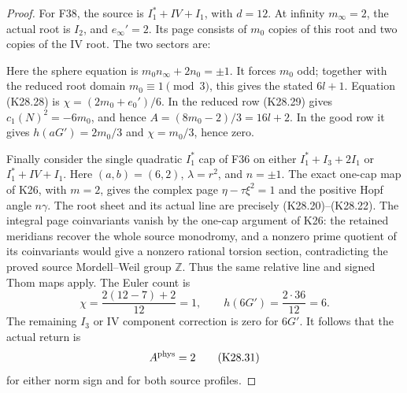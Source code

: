 \begin{proof}
For F38, the source is \(I_1^*+IV+I_1\), with \(d=12\).
At infinity \(m_\infty=2\), the actual root is \(I_2\),
and \(e_\infty'=2\). Its page consists of \(m_0\) copies of this
root and two copies of the IV root. The two sectors are:

\par{}\par\medskip

Here the sphere equation is \(m_0n_\infty+2n_0=\pm1\).
It forces \(m_0\) odd; together with the reduced root domain
\(m_0\equiv1\pmod3\), this gives the stated \(6l+1\).
Equation (K28.28) is \(\chi=(2m_0+e_0')/6\).
In the reduced row (K28.29) gives
\(c_1(N)^2=-6m_0\), and hence
\(A=(8m_0-2)/3=16l+2\). In the good row it gives
\(h(aG')=2m_0/3\) and \(\chi=m_0/3\), hence zero.

Finally consider the single quadratic \(I_1^*\) cap of F36
on either \(I_1^*+I_3+2I_1\) or \(I_1^*+IV+I_1\).
Here \((a,b)=(6,2)\), \(\lambda=r^2\), and \(n=\pm1\).
The exact one-cap map of K26, with \(m=2\), gives the complex
page \(\eta-\tau\xi^2=1\) and the positive Hopf angle \(n\gamma\).
The root sheet and its actual line are precisely (K28.20)--(K28.22).
The integral page coinvariants vanish by the one-cap argument
of K26: the retained meridians recover the whole source
monodromy, and a nonzero prime quotient of its coinvariants
would give a nonzero rational torsion section, contradicting
the proved source Mordell--Weil group \(\mathbb Z\).
Thus the same relative line and signed Thom maps apply.
The Euler count is
\[
              \chi=\frac{2(12-7)+2}{12}=1,\qquad
              h(6G')=\frac{2\cdot36}{12}=6 .
\]
The remaining \(I_3\) or IV component correction is zero for
\(6G'\). It follows that the actual return is
\[
                       A^{\rm phys}=2
 \tag{K28.31}
\]
for either norm sign and for both source profiles.


\end{proof}
